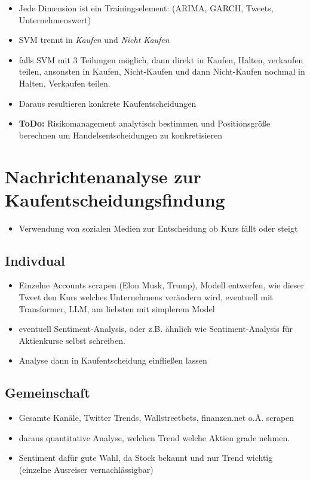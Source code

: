 \begin{itemize}
    \item Jede Dimension ist ein Trainingselement: (ARIMA, GARCH, Tweets, Unternehmenswert)
    \item SVM trennt in \textit{Kaufen} und \textit{Nicht Kaufen}
    \item falls SVM mit 3 Teilungen möglich, dann direkt in Kaufen, Halten, verkaufen teilen, ansonsten in Kaufen, Nicht-Kaufen und dann Nicht-Kaufen nochmal in Halten, Verkaufen teilen.
    \item Daraus resultieren konkrete Kaufentscheidungen
    \item \textbf{ToDo:} Risikomanagement analytisch bestimmen und Positionsgröße berechnen um Handelsentscheidungen zu konkretisieren
\end{itemize}

\section*{Nachrichtenanalyse zur Kaufentscheidungsfindung}

\begin{itemize}
    \item Verwendung von sozialen Medien zur Entscheidung ob Kurs fällt oder steigt
\end{itemize}

\subsection*{Indivdual}
\begin{itemize}
    \item Einzelne Accounts scrapen (Elon Musk, Trump), Modell entwerfen, wie dieser Tweet den Kurs welches Unternehmens verändern wird, eventuell mit Transformer, LLM, am liebsten mit simplerem Model
    \item eventuell Sentiment-Analysis, oder z.B. ähnlich wie Sentiment-Analysis für Aktienkurse selbst schreiben.
    \item Analyse dann in Kaufentscheidung einfließen lassen
\end{itemize}

\subsection*{Gemeinschaft}
\begin{itemize}
    \item Gesamte Kanäle, Twitter Trends, Wallstreetbets, finanzen.net o.Ä. scrapen
    \item daraus quantitative Analyse, welchen Trend welche Aktien grade nehmen.
    \item Sentiment dafür gute Wahl, da Stock bekannt und nur Trend wichtig (einzelne Ausreiser vernachlässigbar)
\end{itemize}